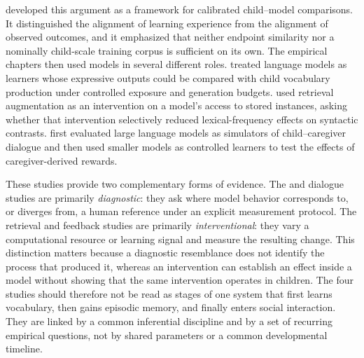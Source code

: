  developed this argument as a framework for calibrated child--model comparisons. It distinguished the alignment of learning experience from the alignment of observed outcomes, and it emphasized that neither endpoint similarity nor a nominally child-scale training corpus is sufficient on its own. The empirical chapters then used models in several different roles.  treated language models as learners whose expressive outputs could be compared with child vocabulary production under controlled exposure and generation budgets.  used retrieval augmentation as an intervention on a model's access to stored instances, asking whether that intervention selectively reduced lexical-frequency effects on syntactic contrasts.  first evaluated large language models as simulators of child--caregiver dialogue and then used smaller models as controlled learners to test the effects of caregiver-derived rewards.

These studies provide two complementary forms of evidence. The \meCDI{} and dialogue studies are primarily \emph{diagnostic}: they ask where model behavior corresponds to, or diverges from, a human reference under an explicit measurement protocol. The retrieval and feedback studies are primarily \emph{interventional}: they vary a computational resource or learning signal and measure the resulting change. This distinction matters because a diagnostic resemblance does not identify the process that produced it, whereas an intervention can establish an effect inside a model without showing that the same intervention operates in children. The four studies should therefore not be read as stages of one system that first learns vocabulary, then gains episodic memory, and finally enters social interaction. They are linked by a common inferential discipline and by a set of recurring empirical questions, not by shared parameters or a common developmental timeline.

